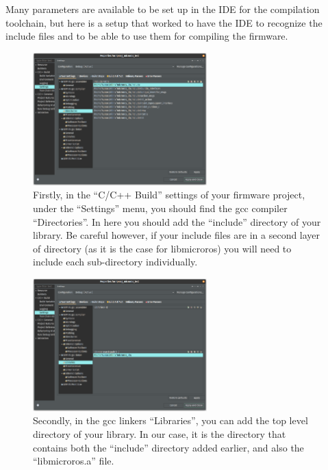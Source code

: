 \documentclass[10pt]{article}
\begin{document}
Many parameters are available to be set up in the IDE for the compilation toolchain, but here is
a setup that worked to have the IDE to recognize the include files and to be able to use them
for compiling the firmware.

\begin{figure}[H]
  \centering
  \includegraphics[width=0.6\textwidth]{./img/vitis_new/include}
  \caption{Firstly, in the ``C/C++ Build'' settings of your firmware project, under the ``Settings'' menu, you should find the gcc compiler
    ``Directories''. In here you should add the ``include'' directory of your library. Be careful however, if your include files are in
  a second layer of directory (as it is the case for libmicroros) you will need to include each sub-directory individually.}
\end{figure}

\begin{figure}[H]
  \centering
  \includegraphics[width=0.6\textwidth]{./img/vitis_new/include2}
  \caption{Secondly, in the gcc linkers ``Libraries'', you can add the top level directory of your library. In our case, it is the
    directory that contains both the ``include'' directory added earlier, and also the ``libmicroros.a'' file.}
\end{figure}
\end{document}
